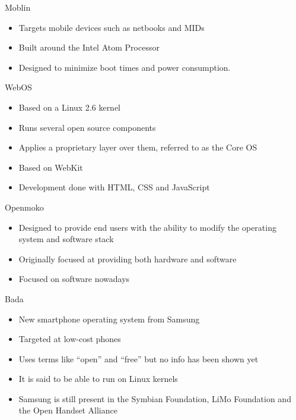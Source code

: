 \documentclass{beamer}
\begin{document}
\begin{frame}{Moblin}
\begin{itemize}
\item Targets mobile devices such as netbooks and MIDs 
\item Built around the Intel Atom Processor
\item Designed to minimize boot times and power consumption.
\end{itemize}
\end{frame}


\begin{frame}{WebOS}
\begin{itemize}
\item Based on a Linux 2.6 kernel
\item Runs several open source components
\item Applies a proprietary layer over them, referred to as the Core OS
\item Based on WebKit
\item Development done with HTML, CSS and JavaScript
\end{itemize}
\end{frame}

\begin{frame}{Openmoko}
\begin{itemize}
\item Designed to provide end users with the ability to modify the operating system and software stack
\item Originally focused at providing both hardware and software
\item Focused on software nowadays
\end{itemize}
\end{frame}

\begin{frame}{Bada}
\begin{itemize}
\item New smartphone operating system from Samsung
\item Targeted at low-cost phones
\item Uses terms like ``open'' and ``free'' but no info has been shown yet
\item It is said to be able to run on Linux kernels
\item Samsung is still present in the Symbian Foundation, LiMo Foundation and the Open Handset Alliance
\end{itemize}
\end{frame}
\end{document}

